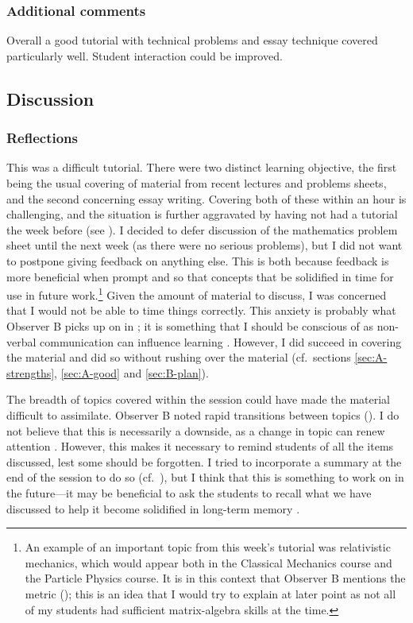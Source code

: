 \subsubsection{Additional comments}

Overall a good tutorial with technical problems and essay technique covered particularly well. Student interaction could be improved.


\subsection{Discussion}\label{sec:me-discuss}

\subsubsection{Reflections}

This was a difficult tutorial. There were two distinct learning objective, the first being the usual covering of material from recent lectures and problems sheets, and the second concerning essay writing. Covering both of these within an hour is challenging, and the situation is further aggravated by having not had a tutorial the week before (see ). I decided to defer discussion of the mathematics problem sheet until the next week (as there were no serious problems), but I did not want to postpone giving feedback on anything else. This is both because feedback is more beneficial when prompt \citep[chapter 4]{Gibbs2015,Jaques2007} and so that concepts that be solidified in time for use in future work.\footnote{An example of an important topic from this week's tutorial was relativistic mechanics, which would appear both in the Classical Mechanics course and the Particle Physics course. It is in this context that Observer B mentions the metric (); this is an idea that I would try to explain at later point as not all of my students had sufficient matrix-algebra skills at the time.} Given the amount of material to discuss, I was concerned that I would not be able to time things correctly. This anxiety is probably what Observer B picks up on in ; it is something that I should be conscious of as non-verbal communication can influence learning \citep[chapter 2]{Brown1988}. However, I did succeed in covering the material and did so without rushing over the material (cf.\ sections \ref{sec:A-strengths}, \ref{sec:A-good} and \ref{sec:B-plan}).

The breadth of topics covered within the session could have made the material difficult to assimilate. Observer B noted rapid transitions between topics (). I do not believe that this is necessarily a downside, as a change in topic can renew attention \citep[chapter 2]{Brown1988}. However, this makes it necessary to remind students of all the items discussed, lest some should be forgotten. I tried to incorporate a summary at the end of the session to do so (cf.\ ), but I think that this is something to work on in the future---it may be beneficial to ask the students to recall what we have discussed to help it become solidified in long-term memory \citep[chapter 2]{Brown1988}.

